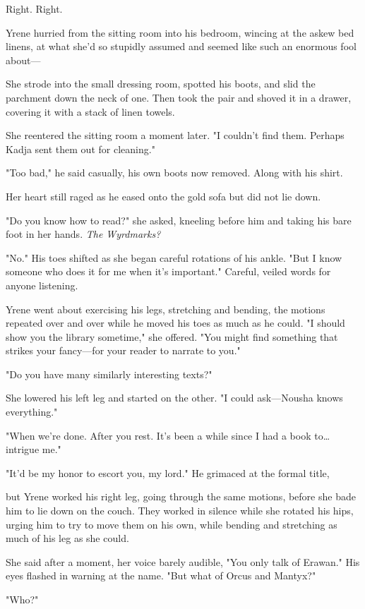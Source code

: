 Right.
Right.

Yrene hurried from the sitting room into his bedroom, wincing at the askew bed linens, at what she'd so stupidly assumed and seemed like such an enormous fool about---

She strode into the small dressing room, spotted his boots, and slid the parchment down the neck of one.
Then took the pair and shoved it in a drawer, covering it with a stack of linen towels.

She reentered the sitting room a moment later.
"I couldn't find them.
Perhaps Kadja sent them out for cleaning."

"Too bad," he said casually, his own boots now removed.
Along with his shirt.

Her heart still raged as he eased onto the gold sofa but did not lie down.

"Do you know how to read?"
she asked, kneeling before him and taking his bare foot in her hands.
\emph{The Wyrdmarks?}

"No."
His toes shifted as she began careful rotations of his ankle.
"But I know someone who does it for me when it's important."
Careful, veiled words for anyone listening.

Yrene went about exercising his legs, stretching and bending, the motions repeated over and over while he moved his toes as much as he could.
"I should show you the library sometime," she offered.
"You might find something that strikes your fancy---for your reader to narrate to you."

"Do you have many similarly interesting texts?"

She lowered his left leg and started on the other.
"I could ask---Nousha knows everything."

"When we're done.
After you rest.
It's been a while since I had a book to\ldots intrigue me."

"It'd be my honor to escort you, my lord."
He grimaced at the formal title,

but Yrene worked his right leg, going through the same motions, before she bade him to lie down on the couch.
They worked in silence while she rotated his hips, urging him to try to move them on his own, while bending and stretching as much of his leg as she could.

She said after a moment, her voice barely audible, "You only talk of Erawan."
His eyes flashed in warning at the name.
"But what of Orcus and Mantyx?"

"Who?"

